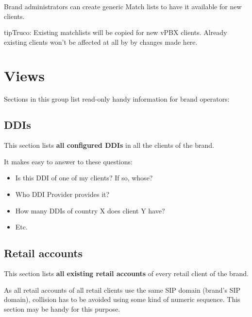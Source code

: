 \documentclass[letterpaper,10pt,spanish]{sphinxmanual}
\begin{document}
Brand administrators can create generic Match lists to have it available for new clients.

\begin{notice}{tip}{Truco:}
Existing matchlists will be copied for new vPBX clients. Already existing clients won't be affected at all by
by changes made here.
\end{notice}


\section{Views}
\label{administration_portal/brand/views/index::doc}\label{administration_portal/brand/views/index:views}
Sections in this group list read-only handy information for brand operators:


\subsection{DDIs}
\label{administration_portal/brand/views/ddis:ddis}\label{administration_portal/brand/views/ddis::doc}
This section lists \textbf{all configured DDIs} in all the clients of the brand.

It makes easy to answer to these questions:
\begin{itemize}
\item {} 
Is this DDI of one of my clients? If so, whose?

\item {} 
Who DDI Provider provides it?

\item {} 
How many DDIs of country X does client Y have?

\item {} 
Etc.

\end{itemize}


\subsection{Retail accounts}
\label{administration_portal/brand/views/retail_accounts::doc}\label{administration_portal/brand/views/retail_accounts:retail-accounts}
This section lists \textbf{all existing retail accounts} of every retail client of the brand.

As all retail accounts of all retail clients use the same SIP domain (brand's SIP domain), collision has to be
avoided using some kind of numeric sequence. This section may be handy for this purpose.
\end{document}
